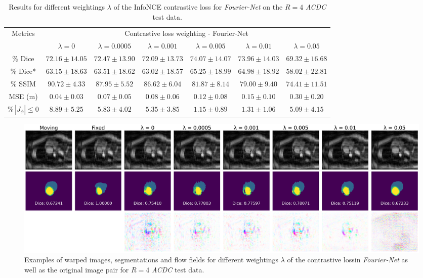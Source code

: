 \documentclass[english,version-2022-01]{uzl-thesis} %
\begin{document}
\begin{table}[h] %
	\scriptsize
	\centering
	\caption{Results for different weightings $\lambda$ of the InfoNCE contrastive loss for \emph{Fourier-Net} on the $R=4$ \emph{ACDC} test data.}
	\label{tab:ContrastiveLossFourierNetAcc4}
	\begin{tabular}{c c c c c c c} %
		\toprule
		\multirow{2}{*}{Metrics} & \multicolumn{6}{c}{Contrastive loss weighting - Fourier-Net} \\
		\cline{2-7}
		 & $\lambda=0$ & $\lambda=0.0005$ & $\lambda=0.001$ & $\lambda=0.005$ & $\lambda=0.01$ & $\lambda=0.05$ \\		
		\midrule
		$\%$ Dice & $72.16 \pm 14.05$ & $72.47 \pm 13.90$ & $72.09 \pm 13.73$ & $74.07 \pm 14.07$ & $73.96 \pm 14.03$ & $69.32 \pm 16.68$ \\
		$\%$ Dice* & $63.15 \pm 18.63$ & $63.51 \pm 18.62$ & $63.02 \pm 18.57$ & $65.25 \pm 18.99$ & $64.98 \pm 18.92$ & $58.02 \pm 22.81$ \\
		$\%$ SSIM & $90.72 \pm 4.33$ & $87.95 \pm 5.52$ & $86.62 \pm 6.04$ & $81.87 \pm 8.14$ & $79.00 \pm 9.40$ & $74.41 \pm 11.51$ \\
		MSE (m) & $0.04 \pm 0.03$ & $0.07 \pm 0.05$ & $0.08 \pm 0.06$ & $0.12 \pm 0.08$ & $0.15 \pm 0.10$ & $0.30 \pm 0.20$ \\
		$\% \, |J_{\phi}|\leq0$ & $8.89 \pm 5.25$ & $5.83 \pm 4.02$ & $5.35 \pm 3.85$ & $1.15 \pm 0.89$ & $1.31 \pm 1.06$ & $5.09 \pm 4.15$ \\
		\bottomrule
	\end{tabular}	
\end{table}

\begin{figure}[h]
	\centering
	\graphicspath{{images/}{\main/images/}}
	\includegraphics[width=\textwidth]{ContrastiveLoss_Mode1.png}	
	\caption{Examples of warped images, segmentations and flow fields for different weightings $\lambda$ of the contrastive lossin \emph{Fourier-Net} as well as the original image pair for $R=4$ \emph{ACDC} test data.}
	\label{fig:TestExamplesContrastiveLoss}
\end{figure}
\end{document}
